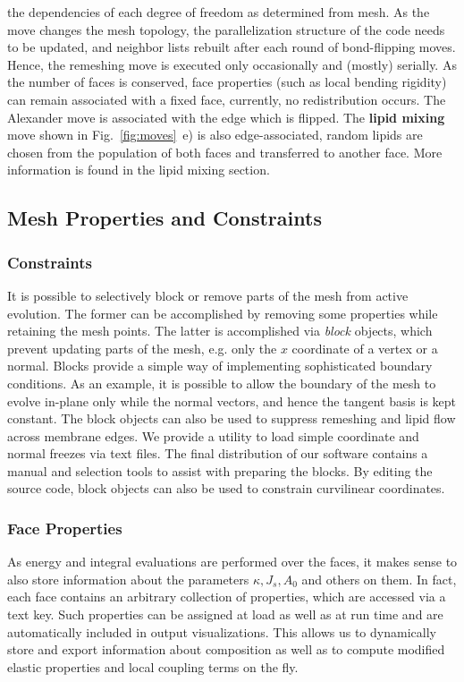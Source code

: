 \documentclass[twocolumn]{biophys-new}
\begin{document}
 the dependencies of each degree of freedom as determined from mesh. As the move changes the mesh topology, the parallelization structure of the code needs to be updated, and neighbor lists rebuilt after each round of bond-flipping moves. Hence, the remeshing move is executed only occasionally and (mostly) serially. As the number of faces is conserved, face properties (such as local bending rigidity) can remain associated with a fixed face, currently, no redistribution occurs. The Alexander move is associated with the edge which is flipped. The \textbf{lipid mixing} move shown in Fig.~\ref{fig:moves}~e) is also edge-associated, random lipids are chosen from the population of both faces and transferred to another face. More information is found in the lipid mixing section.

\subsection*{Mesh Properties and Constraints}

\subsubsection*{Constraints}

It is possible to selectively block or remove parts of the mesh from active evolution. The former can be accomplished by removing some properties while retaining the mesh points. The latter is accomplished via \textit{block} objects, which prevent updating parts of the mesh, e.g. only the $x$ coordinate of a vertex or a normal. Blocks provide a simple way of implementing sophisticated boundary conditions. As an example, it is possible to allow the boundary of the mesh to evolve in-plane only while the normal vectors, and hence the tangent basis is kept constant. The block objects can also be used to suppress remeshing and lipid flow across membrane edges. We provide a utility to load simple coordinate and normal freezes via text files. The final distribution of our software contains a manual and selection tools to assist with preparing the blocks. By editing the source code, block objects can also be used to constrain curvilinear coordinates.



\subsubsection*{Face Properties}
As energy and integral evaluations are performed over the faces, it makes sense to also store information about the parameters $\kappa, J_s, A_0$ and others on them. In fact, each face contains an arbitrary collection of properties, which are accessed via a text key. Such properties can be assigned at load as well as at run time and are automatically included in output visualizations. This allows us to dynamically store and export information about composition as well as to compute modified elastic properties and local coupling terms on the fly. 
\end{document}
